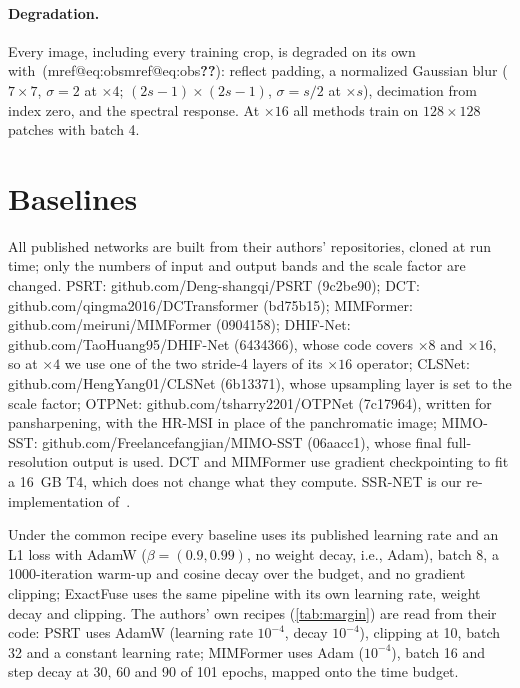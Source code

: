 \documentclass[10pt,twocolumn,letterpaper]{article}
\makeatletter
\newcommand{\mref}[1]{\ifcsname mref@#1\endcsname\csname mref@#1\endcsname\else\textbf{??}\fi}
\makeatother
\begin{document}
\paragraph{Degradation.} Every image, including every training crop, is degraded on its own with~(\mref{eq:obs}): reflect padding, a normalized Gaussian blur ($7\times7$, $\sigma=2$ at $\times4$; $(2s-1)\times(2s-1)$, $\sigma=s/2$ at $\times s$), decimation from index zero, and the spectral response. At $\times16$ all methods train on $128\times128$ patches with batch 4.

\section{Baselines}
\label{sec:baselines}
All published networks are built from their authors' repositories, cloned at run time; only the numbers of input and output bands and the scale factor are changed. PSRT: github.com/Deng-shangqi/PSRT (9c2be90); DCT: github.com/qingma2016/DCTransformer (bd75b15); MIMFormer: github.com/meiruni/MIMFormer (0904158); DHIF-Net: github.com/TaoHuang95/DHIF-Net (6434366), whose code covers $\times8$ and $\times16$, so at $\times4$ we use one of the two stride-4 layers of its $\times16$ operator; CLSNet: github.com/HengYang01/CLSNet (6b13371), whose upsampling layer is set to the scale factor; OTPNet: github.com/tsharry2201/OTPNet (7c17964), written for pansharpening, with the HR-MSI in place of the panchromatic image; MIMO-SST: github.com/Freelancefangjian/MIMO-SST (06aacc1), whose final full-resolution output is used. DCT and MIMFormer use gradient checkpointing to fit a 16~GB T4, which does not change what they compute. SSR-NET is our re-implementation of~\cite{zhang2021ssrnet}.

Under the common recipe every baseline uses its published learning rate and an L1 loss with AdamW ($\beta=(0.9,0.99)$, no weight decay, i.e., Adam), batch 8, a 1000-iteration warm-up and cosine decay over the budget, and no gradient clipping; ExactFuse uses the same pipeline with its own learning rate, weight decay and clipping. The authors' own recipes (\cref{tab:margin}) are read from their code: PSRT uses AdamW (learning rate $10^{-4}$, decay $10^{-4}$), clipping at 10, batch 32 and a constant learning rate; MIMFormer uses Adam ($10^{-4}$), batch 16 and step decay at 30, 60 and 90 of 101 epochs, mapped onto the time budget.
\end{document}
